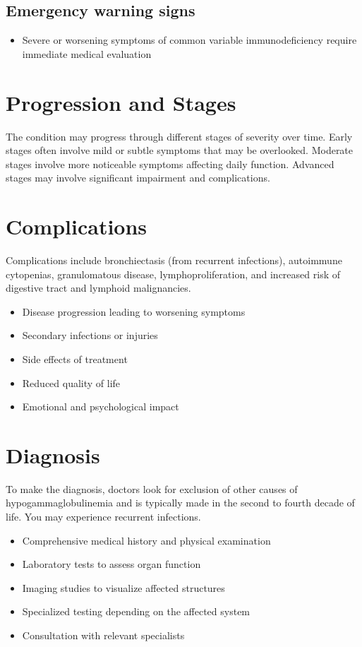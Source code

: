 \subsection{Emergency warning signs}
\begin{itemize}[noitemsep]
  \item Severe or worsening symptoms of common variable immunodeficiency require immediate medical evaluation
\end{itemize}
\section{Progression and Stages}
The condition may progress through different stages of severity over time. Early stages often involve mild or subtle symptoms that may be overlooked. Moderate stages involve more noticeable symptoms affecting daily function. Advanced stages may involve significant impairment and complications.
\section{Complications}
Complications include bronchiectasis (from recurrent infections), autoimmune cytopenias, granulomatous disease, lymphoproliferation, and increased risk of digestive tract and lymphoid malignancies.

\begin{itemize}[noitemsep]
  \item Disease progression leading to worsening symptoms
  \item Secondary infections or injuries
  \item Side effects of treatment
  \item Reduced quality of life
  \item Emotional and psychological impact
\end{itemize}
\section{Diagnosis}
To make the diagnosis, doctors look for exclusion of other causes of hypogammaglobulinemia and is typically made in the second to fourth decade of life. You may experience recurrent infections.

\begin{itemize}[noitemsep]
  \item Comprehensive medical history and physical examination
  \item Laboratory tests to assess organ function
  \item Imaging studies to visualize affected structures
  \item Specialized testing depending on the affected system
  \item Consultation with relevant specialists
\end{itemize}
